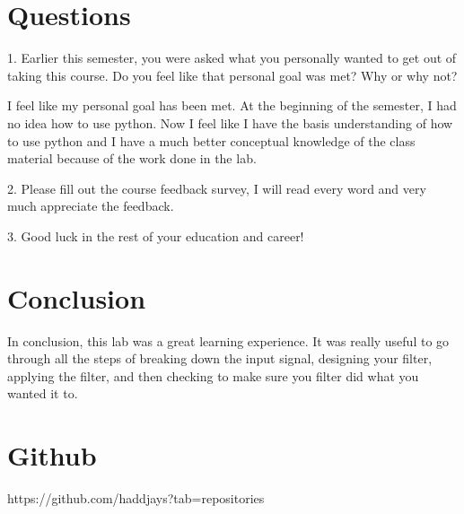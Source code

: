 \documentclass[11pt,a4]{report}
\begin{document}
\section{Questions}
1. Earlier this semester, you were asked what you personally wanted to get out of taking this
course. Do you feel like that personal goal was met? Why or why not?

I feel like my personal goal has been met. At the beginning of the semester, I had no idea how to use python. Now I feel like I have the basis understanding of how to use python and I have a much better conceptual knowledge of the class material because of the work done in the lab. 

2. Please fill out the course feedback survey, I will read every word and very much appreciate
the feedback.

3. Good luck in the rest of your education and career!

\section{Conclusion}
In conclusion, this lab was a great learning experience. It was really useful to go through all the steps of breaking down the input signal, designing your filter, applying the filter, and then checking to make sure you filter did what you wanted it to. 

\section{Github}
https://github.com/haddjays?tab=repositories
\end{document}

